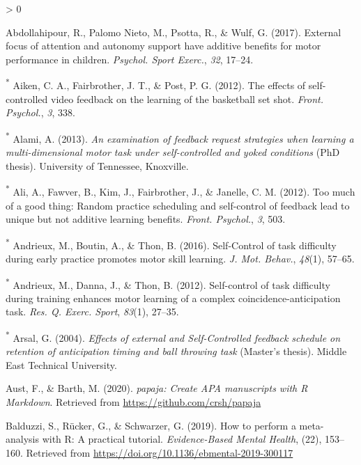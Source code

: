 \documentclass[
  english,
  man,floatsintext]{apa7}
\newlength{\cslhangindent}
\newenvironment{CSLReferences}[2] %
 {%
  \setlength{\parindent}{0pt}
  \ifodd #1 \everypar{\setlength{\hangindent}{\cslhangindent}}\ignorespaces\fi
  \ifnum #2 > 0
  \setlength{\parskip}{#2\baselineskip}
  \fi
 }%
 {}
\begin{document}
\endgroup

\hypertarget{refs}{}
\begin{CSLReferences}{1}{0}
\leavevmode\hypertarget{ref-Abdollahipour2017-dr}{}%
Abdollahipour, R., Palomo Nieto, M., Psotta, R., \& Wulf, G. (2017). External focus of attention and autonomy support have additive benefits for motor performance in children. \emph{Psychol. Sport Exerc.}, \emph{32}, 17--24.

\leavevmode\hypertarget{ref-Aiken2012-po}{}%
\textsuperscript{*} Aiken, C. A., Fairbrother, J. T., \& Post, P. G. (2012). The effects of self-controlled video feedback on the learning of the basketball set shot. \emph{Front. Psychol.}, \emph{3}, 338.

\leavevmode\hypertarget{ref-Alami2013-gy}{}%
\textsuperscript{*} Alami, A. (2013). \emph{An examination of feedback request strategies when learning a multi-dimensional motor task under self-controlled and yoked conditions} (PhD thesis). University of Tennessee, Knoxville.

\leavevmode\hypertarget{ref-Ali2012-rq}{}%
\textsuperscript{*} Ali, A., Fawver, B., Kim, J., Fairbrother, J., \& Janelle, C. M. (2012). Too much of a good thing: Random practice scheduling and self-control of feedback lead to unique but not additive learning benefits. \emph{Front. Psychol.}, \emph{3}, 503.

\leavevmode\hypertarget{ref-Andrieux2016-lf}{}%
\textsuperscript{*} Andrieux, M., Boutin, A., \& Thon, B. (2016). {Self-Control} of task difficulty during early practice promotes motor skill learning. \emph{J. Mot. Behav.}, \emph{48}(1), 57--65.

\leavevmode\hypertarget{ref-Andrieux2012-dj}{}%
\textsuperscript{*} Andrieux, M., Danna, J., \& Thon, B. (2012). Self-control of task difficulty during training enhances motor learning of a complex coincidence-anticipation task. \emph{Res. Q. Exerc. Sport}, \emph{83}(1), 27--35.

\leavevmode\hypertarget{ref-Arsal2004-kf}{}%
\textsuperscript{*} Arsal, G. (2004). \emph{Effects of external and {Self-Controlled} feedback schedule on retention of anticipation timing and ball throwing task} (Master's thesis). Middle East Technical University.

\leavevmode\hypertarget{ref-R-papaja}{}%
Aust, F., \& Barth, M. (2020). \emph{{papaja}: {Create} {APA} manuscripts with {R Markdown}}. Retrieved from \url{https://github.com/crsh/papaja}

\leavevmode\hypertarget{ref-R-meta}{}%
Balduzzi, S., Rücker, G., \& Schwarzer, G. (2019). How to perform a meta-analysis with {R}: A practical tutorial. \emph{Evidence-Based Mental Health}, (22), 153--160. Retrieved from \url{https://doi.org/10.1136/ebmental-2019-300117}


\end{CSLReferences}
\end{document}
